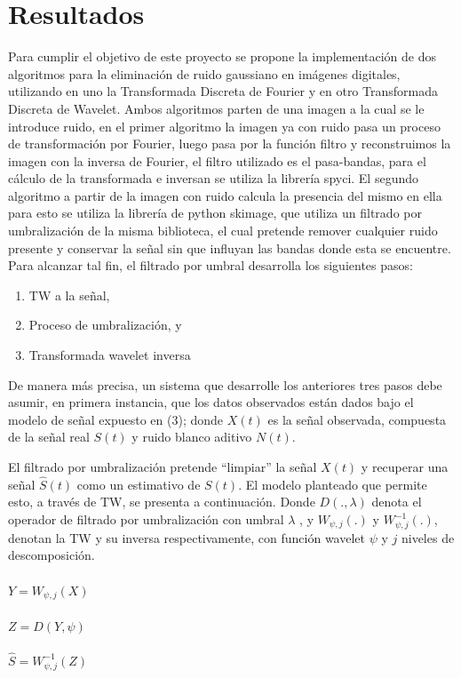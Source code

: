 \documentclass[a4paper,10pt,twocolumn]{article}
\begin{document}
\section{Resultados}\label{sec:result}
 Para cumplir el objetivo de este proyecto se propone la implementación de dos algoritmos para la eliminación de ruido gaussiano en imágenes digitales, utilizando en uno la Transformada Discreta de Fourier y en otro Transformada Discreta de Wavelet. Ambos algoritmos parten de una imagen a la cual se le introduce ruido, en el primer algoritmo la imagen ya con ruido pasa un proceso de transformación por Fourier, luego pasa por la función filtro y reconstruimos la imagen con la inversa de Fourier, el filtro utilizado es el pasa-bandas, para el cálculo de la transformada e inversan se utiliza la librería spyci. El segundo algoritmo a partir de la imagen con ruido calcula la presencia del mismo en ella para esto se utiliza la librería de python skimage, que utiliza un filtrado por umbralización de la misma biblioteca, el cual pretende remover cualquier ruido presente y conservar la señal sin que influyan las bandas donde esta se encuentre. Para alcanzar tal fin, el filtrado por umbral desarrolla los siguientes pasos:\begin{enumerate}
\item TW a la señal,
\item Proceso de umbralización, y 
\item Transformada wavelet inversa  
\end{enumerate}

 De manera más precisa, un sistema que desarrolle los anteriores tres pasos debe asumir, en primera instancia, que los datos observados están dados bajo el modelo de señal expuesto en (3); donde $X(t)$ es la señal observada, compuesta de la señal real $S(t)$ y ruido blanco aditivo $N(t)$.

 El filtrado por umbralización pretende “limpiar” la señal $X(t)$ y recuperar una señal  $\hat{S}(t)$ como un estimativo de $S(t)$. El modelo planteado que permite esto, a través de TW, se presenta a continuación. Donde $D(.,\lambda)$ denota el operador de filtrado por umbralización con umbral $\lambda$ , y $W_{\psi,j}(.)$ y $W_{\psi,j}^{-1}(.)$, denotan la TW y su inversa respectivamente, con función wavelet $\psi$ y $j$ niveles de descomposición. \\\\
$Y = W_{\psi,j}(X)$\\\\
$Z = D(Y,\psi)$\\\\
$\hat{S}= W_{\psi,j}^{-1}(Z)$\\
\end{document}
